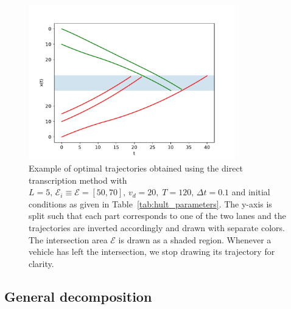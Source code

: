 \documentclass[a4paper]{article}
\theoremstyle{definition}
\theoremstyle{plain}
\begin{document}
\begin{figure}
  \centering
  \includegraphics[width=0.8\textwidth]{figures/trajectories_general.pdf}
  \caption{Example of optimal trajectories obtained using the direct
    transcription method with
    $L = 5, \, \mathcal{E}_{i} \equiv \mathcal{E} = [50, 70], \, v_{d} = 20, \; T=120, \, \Delta t = 0.1$
    and initial conditions as given in Table~\ref{tab:hult_parameters}. The
    y-axis is split such that each part corresponds to one of the two lanes and
    the trajectories are inverted accordingly and drawn with separate colors.
    The intersection area $\mathcal{E}$ is drawn as a shaded region. Whenever a
    vehicle has left the intersection, we stop drawing its trajectory for
    clarity.}
  \label{fig:direct_transcription_example}
\end{figure}


\subsection{General decomposition}
\end{document}
